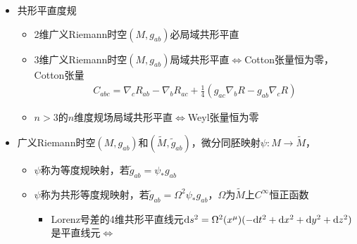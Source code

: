 \begin{itemize}
\begin{itemize}
\begin{align*}
            \tilde{R}_{ac} = & R_{ac} - (n-2) \nabla_a \nabla_c (\ln \Omega) - g_{ac} g^{de} \nabla_d \nabla_e (\ln \Omega) + (n-2) \nabla_a (\ln \Omega) \nabla_c (\ln \Omega) 
            \\
            &- (n-2) g_{ac} g^{de} \nabla^d (\ln \Omega) \nabla_e (\ln \Omega)
        \end{align*}
        \item 标量曲率
        \begin{gather*}
            \tilde{R} = \Omega^{-2} \left[ R - 2(n-1) g^{ac} \nabla_a \nabla_c (\ln \Omega) - (n-1)(n-2) g^{ac} \nabla_a (\ln \Omega) \nabla_c (\ln \Omega) \right]
        \end{gather*}
        \item Weyl张量
        \begin{gather*}
            {\tilde{C}_{abc}}^d = {C_{abc}}^d
            \\
            \tilde{C}_{abcd} = \Omega^2 C_{abcd}
        \end{gather*}
        Weyl张量是共形张量
    \end{itemize}
    \item 共形平直度规
    \begin{itemize}
        \item 2维广义Riemann时空$(M, g_{ab})$必局域共形平直
        \item 3维广义Riemann时空$(M, g_{ab})$局域共形平直$\iff$Cotton张量恒为零，Cotton张量
        \begin{gather*}
            C_{abc} = \nabla_c R_{ab} - \nabla_b R_{ac} + \frac{1}{4} (g_{ac} \nabla_b R - g_{ab} \nabla_c R)
        \end{gather*}
        \item $n>3$的$n$维度规场局域共形平直$\iff$Weyl张量恒为零
    \end{itemize}
    \item 广义Riemann时空$(M, g_{ab})$和$(\tilde{M}, \tilde{g}_{ab})$，微分同胚映射$\psi: M \to \tilde{M}$，
    \begin{itemize}
        \item $\psi$称为等度规映射，若$\tilde{g}_{ab} = \psi_{*} g_{ab}$
        \item $\psi$称为共形等度规映射，若$\tilde{g}_{ab} = \Omega^2 \psi_{*} g_{ab}$，$\Omega$为$\tilde{M}$上$C^{\infty}$恒正函数
        \begin{itemize}
            \item Lorenz号差的4维共形平直线元$\mathrm{d} s^2= \Omega^2(x^{\mu}) (-\mathrm{d} t^2+\mathrm{d} x^2+\mathrm{d} y^2+\mathrm{d} z^2)$是平直线元$\iff$

\end{itemize}
\end{itemize}
\end{itemize}
